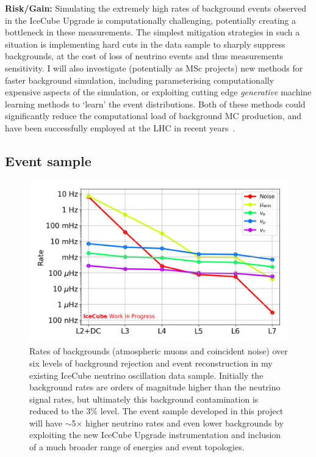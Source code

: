 \documentclass[a4paper,11pt]{article}
\begin{document}

\textbf{Risk/Gain:} Simulating the extremely high rates of background events observed in the IceCube Upgrade is computationally challenging, potentially creating a bottleneck in these measurements. The simplest mitigation strategies in such a situation is implementing hard cuts in the data sample to sharply suppress backgrounds, at the cost of loss of neutrino events and thus measurements sensitivity. I will also investigate (potentially as MSc projects) new methods for faster background simulation, including parameterising computationally expensive aspects of the simulation, or exploiting cutting edge \textit{generative} machine learning methods to `learn' the event distributions. Both of these methods could significantly reduce the computational load of background MC production, and have been successfully employed at the LHC in recent years~\cite{Barberio:2009zza, ATLAS:2010bfa, Paganini:2017hrr}. \\


\subsection{Event sample}

\begin{figure} %
    \centering
    \includegraphics[trim=0.0cm 0.0cm 0.cm 0.0cm, clip=true, width=\linewidth]{images/OscNext_high_stats_event_selection_levels.png}
    \caption{Rates of backgrounds (atmospheric muons and coincident noise) over six levels of background rejection and event reconstruction in my existing IceCube neutrino oscillation data sample. Initially the background rates are orders of magnitude higher than the neutrino signal rates, but ultimately this background contamination is reduced to the 3\% level. The event sample developed in this project will have $\sim$5$\times$ higher neutrino rates and even lower backgrounds by exploiting the new IceCube Upgrade instrumentation and inclusion of a much broader range of energies and event topologies.}
    \label{fig:event_selection}
\end{figure}
\end{document}
